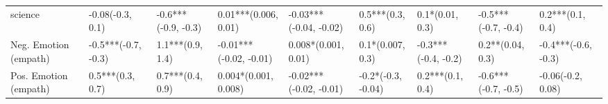 \begin{tabular}{lllllllll}
science               &     -0.08(-0.3, 0.1) &  -0.6***(-0.9, -0.3) &      0.01***(0.006, 0.01) &  -0.03***(-0.04, -0.02) &     0.5***(0.3, 0.6) &      0.1*(0.01, 0.3) &  -0.5***(-0.7, -0.4) &     0.2***(0.1, 0.4) \\
Neg. Emotion (empath) &  -0.5***(-0.7, -0.3) &     1.1***(0.9, 1.4) &    -0.01***(-0.02, -0.01) &     0.008*(0.001, 0.01) &     0.1*(0.007, 0.3) &  -0.3***(-0.4, -0.2) &     0.2**(0.04, 0.3) &  -0.4***(-0.6, -0.3) \\
Pos. Emotion (empath) &     0.5***(0.3, 0.7) &     0.7***(0.4, 0.9) &      0.004*(0.001, 0.008) &  -0.02***(-0.02, -0.01) &   -0.2*(-0.3, -0.04) &     0.2***(0.1, 0.4) &  -0.6***(-0.7, -0.5) &    -0.06(-0.2, 0.08) \\
\bottomrule
\end{tabular}
